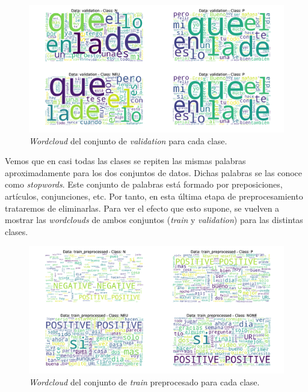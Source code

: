 \documentclass[11pt]{article}
\begin{document}
\begin{figure}[H]
\includegraphics[width=\linewidth]{images/wordcloud/wordcloud_validation.png}
\caption{\textit{Wordcloud} del conjunto de \textit{validation} para cada clase.}
\end{figure}

Vemos que en casi todas las clases se repiten las mismas palabras aproximadamente para los dos conjuntos de datos. Dichas palabras se las conoce como \textit{stopwords}. Este conjunto de palabras está formado por preposiciones, artículos, conjunciones, etc. Por tanto, en esta última etapa de preprocesamiento trataremos de eliminarlas. Para ver el efecto que esto supone, se vuelven a mostrar las \textit{wordclouds} de ambos conjuntos (\textit{train} y \textit{validation}) para las distintas clases.

\begin{figure}[H]
\includegraphics[width=\linewidth]{images/wordcloud/wordcloud_train_preprocessed.png}
\caption{\textit{Wordcloud} del conjunto de \textit{train} preprocesado para cada clase.}
\end{figure}
\end{document}
